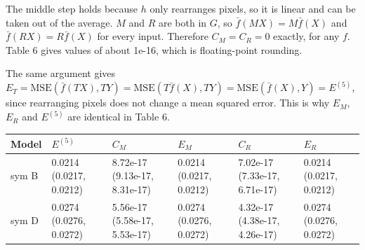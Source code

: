 \documentclass[11pt]{article}
\begin{document}
The middle step holds because \(h\) only rearranges pixels, so it is linear and can be taken out of the average. \(M\) and \(R\) are both in \(G\), so \(\bar f(MX) = M\bar f(X)\) and \(\bar f(RX) = R\bar f(X)\) for every input. Therefore \(C_M = C_R = 0\) exactly, for any \(f\). Table 6 gives values of about 1e-16, which is floating-point rounding.

The same argument gives \(E_T = \mathrm{MSE}(\bar f(TX), TY) = \mathrm{MSE}(T\bar f(X), TY) = \mathrm{MSE}(\bar f(X), Y) = E^{(5)}\), since rearranging pixels does not change a mean squared error. This is why \(E_M\), \(E_R\) and \(E^{(5)}\) are identical in Table 6.

\begin{table}[!htbp]\centering\footnotesize\setlength{\tabcolsep}{4pt}
\begin{tabular}{llllll}
\toprule
Model & $E^{(5)}$ & $C_M$ & $E_M$ & $C_R$ & $E_R$\\
\midrule
sym B & \makecell[l]{0.0214\\{\scriptsize(0.0217, 0.0212)}} & \makecell[l]{8.72e-17\\{\scriptsize(9.13e-17, 8.31e-17)}} & \makecell[l]{0.0214\\{\scriptsize(0.0217, 0.0212)}} & \makecell[l]{7.02e-17\\{\scriptsize(7.33e-17, 6.71e-17)}} & \makecell[l]{0.0214\\{\scriptsize(0.0217, 0.0212)}}\\
sym D & \makecell[l]{0.0274\\{\scriptsize(0.0276, 0.0272)}} & \makecell[l]{5.56e-17\\{\scriptsize(5.58e-17, 5.53e-17)}} & \makecell[l]{0.0274\\{\scriptsize(0.0276, 0.0272)}} & \makecell[l]{4.32e-17\\{\scriptsize(4.38e-17, 4.26e-17)}} & \makecell[l]{0.0274\\{\scriptsize(0.0276, 0.0272)}}\\
\bottomrule
\end{tabular}


\end{table}
\end{document}
